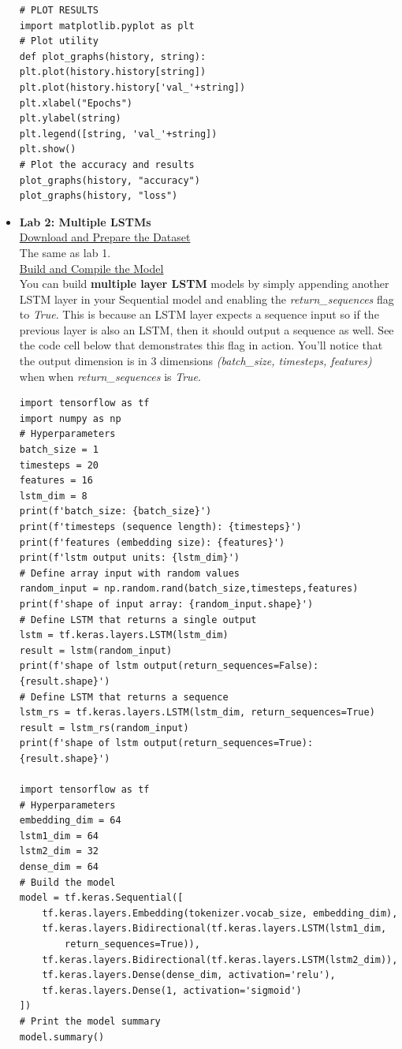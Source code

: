 \documentclass[20pt]{article}
\begin{document}
\begin{itemize}
\begin{verbatim}
# PLOT RESULTS
import matplotlib.pyplot as plt
# Plot utility
def plot_graphs(history, string):
plt.plot(history.history[string])
plt.plot(history.history['val_'+string])
plt.xlabel("Epochs")
plt.ylabel(string)
plt.legend([string, 'val_'+string])
plt.show()
# Plot the accuracy and results 
plot_graphs(history, "accuracy")
plot_graphs(history, "loss")
		\end{verbatim}
	 	\item \textbf{Lab 2: Multiple LSTMs}\\	
	 	\underline{Download and Prepare the Dataset}\\
	 	The same as lab 1.\\
	 	\underline{Build and Compile the Model}\\
	 	You can build \textbf{multiple layer LSTM} models by simply appending another LSTM layer in your Sequential model and enabling the \textit{return\_sequences} flag to \textit{True}. This is because an LSTM layer expects a sequence input so if the previous layer is also an LSTM, then it should output a sequence as well. See the code cell below that demonstrates this flag in action. You'll notice that the output dimension is in 3 dimensions \textit{(batch\_size, timesteps, features)} when when \textit{return\_sequences} is \textit{True}.
	 	\begin{verbatim}
import tensorflow as tf
import numpy as np
# Hyperparameters
batch_size = 1
timesteps = 20
features = 16
lstm_dim = 8
print(f'batch_size: {batch_size}')
print(f'timesteps (sequence length): {timesteps}')
print(f'features (embedding size): {features}')
print(f'lstm output units: {lstm_dim}')
# Define array input with random values
random_input = np.random.rand(batch_size,timesteps,features)
print(f'shape of input array: {random_input.shape}')
# Define LSTM that returns a single output
lstm = tf.keras.layers.LSTM(lstm_dim)
result = lstm(random_input)
print(f'shape of lstm output(return_sequences=False): {result.shape}')
# Define LSTM that returns a sequence
lstm_rs = tf.keras.layers.LSTM(lstm_dim, return_sequences=True)
result = lstm_rs(random_input)
print(f'shape of lstm output(return_sequences=True): {result.shape}')

import tensorflow as tf
# Hyperparameters
embedding_dim = 64
lstm1_dim = 64
lstm2_dim = 32
dense_dim = 64
# Build the model
model = tf.keras.Sequential([
	tf.keras.layers.Embedding(tokenizer.vocab_size, embedding_dim),
	tf.keras.layers.Bidirectional(tf.keras.layers.LSTM(lstm1_dim,
		return_sequences=True)),
	tf.keras.layers.Bidirectional(tf.keras.layers.LSTM(lstm2_dim)),
	tf.keras.layers.Dense(dense_dim, activation='relu'),
	tf.keras.layers.Dense(1, activation='sigmoid')
])
# Print the model summary
model.summary()


\end{verbatim}
\end{itemize}
\end{document}
